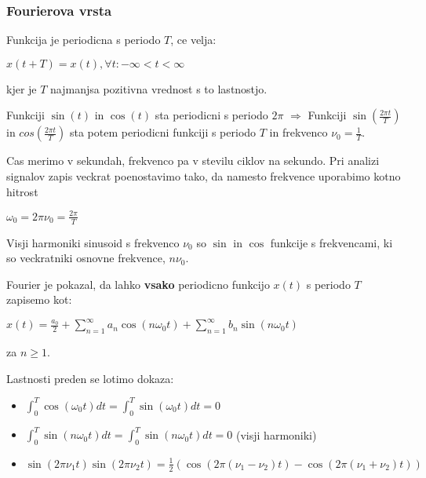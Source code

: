 \documentclass{article}
\begin{document}
\begin{multicols}{2}
	\subsubsection{Fourierova vrsta}
	Funkcija je periodicna s periodo $T$, ce velja:
	\begin{center}
		\begin{math}
			x(t + T) = x(t), \forall t: -\infty < t < \infty
		\end{math}
	\end{center}
	kjer je $T$ najmanjsa pozitivna vrednost s to lastnostjo.

	Funkciji $\sin(t)$ in $\cos(t)$ sta periodicni s periodo $2\pi$  $\Rightarrow$
	Funkciji $\sin(\frac{2 \pi t}{T})$ in $cos(\frac{2 \pi t}{T})$ sta potem periodicni funkciji
	s periodo $T$ in frekvenco $\nu_0 = \frac{1}{T}$.

	Cas merimo v sekundah, frekvenco pa v stevilu ciklov na sekundo. Pri analizi
	signalov zapis veckrat poenostavimo tako, da namesto frekvence uporabimo kotno hitrost
	\begin{center}
		\begin{math}
			\omega_0 = 2 \pi \nu_0 = \frac{2\pi}{T}
		\end{math}
	\end{center}

	Visji harmoniki sinusoid s frekvenco $\nu_0$ so $\sin$ in $\cos$ funkcije s frekvencami,
	ki so veckratniki osnovne frekvence, $n \nu_0$.

	Fourier je pokazal, da lahko \textbf{vsako} periodicno funkcijo $x(t)$ s periodo $T$ zapisemo kot:
	\begin{center}
		\begin{math}
			x(t) = \frac{a_0}{2} + \sum_{n = 1}^{\infty} a_n \cos(n \omega_0 t) +
			\sum_{n = 1}^{\infty} b_n \sin(n \omega_0 t)
		\end{math}
	\end{center}
	za $n \geq 1$.

	Lastnosti preden se lotimo dokaza:
	\begin{itemize}
		\item
		      \begin{center}
			      $\int_{0}^T \cos (\omega_0 t) dt = \int_{0}^T \sin (\omega_0 t) dt = 0$
		      \end{center}
		\item
		      \begin{center}
			      $\int_{0}^T \sin (n \omega_0 t) dt = \int_{0}^T \sin (n \omega_0 t) dt = 0$ (visji harmoniki)
		      \end{center}
		\item
		      \begin{center}
			      $\sin (2 \pi \nu_1 t) \sin (2 \pi \nu_2 t) = \frac{1}{2} (\cos (2 \pi (\nu_1 - \nu_2) t) - \cos (2 \pi (\nu_1 + \nu_2) t))$
		      \end{center}
	\end{itemize}


\end{multicols}
\end{document}
